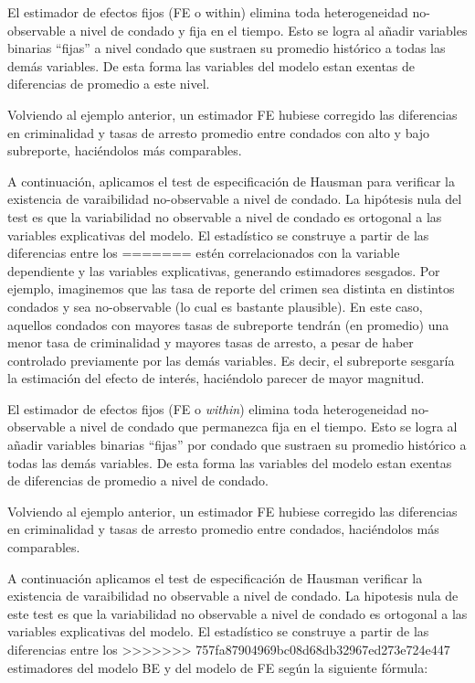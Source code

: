 \documentclass[
]{article}
\begin{document}
El estimador de efectos fijos (FE o within) elimina toda heterogeneidad
no-observable a nivel de condado y fija en el tiempo. Esto se logra al
añadir variables binarias ``fijas'' a nivel condado que sustraen su
promedio histórico a todas las demás variables. De esta forma las
variables del modelo estan exentas de diferencias de promedio a este
nivel.

Volviendo al ejemplo anterior, un estimador FE hubiese corregido las
diferencias en criminalidad y tasas de arresto promedio entre condados
con alto y bajo subreporte, haciéndolos más comparables.

A continuación, aplicamos el test de especificación de Hausman para
verificar la existencia de varaibilidad no-observable a nivel de
condado. La hipótesis nula del test es que la variabilidad no observable
a nivel de condado es ortogonal a las variables explicativas del modelo.
El estadístico se construye a partir de las diferencias entre los
=======
estén correlacionados con la variable dependiente y las variables
explicativas, generando estimadores sesgados. Por ejemplo, imaginemos
que las tasa de reporte del crimen sea distinta en distintos condados y
sea no-observable (lo cual es bastante plausible). En este caso,
aquellos condados con mayores tasas de subreporte tendrán (en promedio)
una menor tasa de criminalidad y mayores tasas de arresto, a pesar de
haber controlado previamente por las demás variables. Es decir, el
subreporte sesgaría la estimación del efecto de interés, haciéndolo
parecer de mayor magnitud.

El estimador de efectos fijos (FE o \emph{within}) elimina toda
heterogeneidad no-observable a nivel de condado que permanezca fija en
el tiempo. Esto se logra al añadir variables binarias ``fijas'' por
condado que sustraen su promedio histórico a todas las demás variables.
De esta forma las variables del modelo estan exentas de diferencias de
promedio a nivel de condado.

Volviendo al ejemplo anterior, un estimador FE hubiese corregido las
diferencias en criminalidad y tasas de arresto promedio entre condados,
haciéndolos más comparables.

A continuación aplicamos el test de especificación de Hausman verificar
la existencia de varaibilidad no observable a nivel de condado. La
hipotesis nula de este test es que la variabilidad no observable a nivel
de condado es ortogonal a las variables explicativas del modelo. El
estadístico se construye a partir de las diferencias entre los
>>>>>>> 757fa87904969bc08d68db32967ed273e724e447
estimadores del modelo BE y del modelo de FE según la siguiente fórmula:
\end{document}
